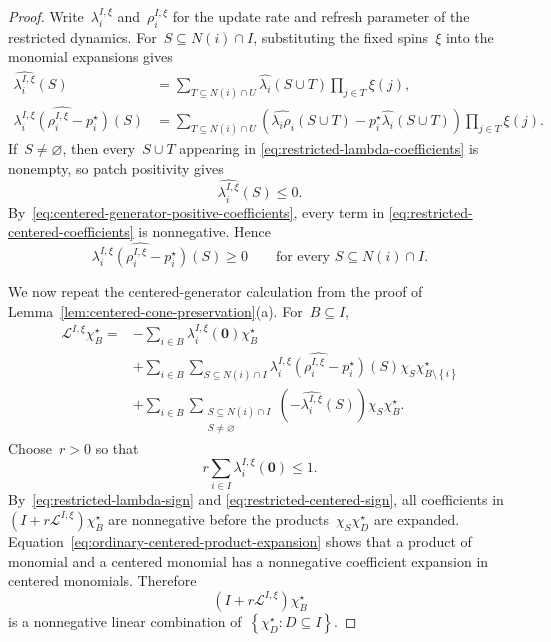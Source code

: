 \documentclass[EJP,preprint,NODS,nobera]{ejpecp}
\newcommand{\bb}[1]{\left(#1\right)}
\newcommand{\cb}[1]{\left\{#1\right\}}
\newcommand{\mb}[1]{\mathbf{#1}}
\newcommand{\Lcal}{\mathcal{L}}
\begin{document}
\begin{proof}
Write~$\lambda_i^{I,\xi}$ and~$\rho_i^{I,\xi}$ for the update rate and
refresh parameter of the restricted dynamics. For~$S\subseteq N(i)\cap I$,
substituting the fixed spins~$\xi$ into the monomial expansions gives
\begin{align}
\widehat{\lambda_i^{I,\xi}}(S)
&=
\sum_{T\subseteq N(i)\cap U}
\widehat{\lambda_i}(S\cup T)
\prod_{j\in T}\xi(j),
\label{eq:restricted-lambda-coefficients}
\\
\widehat{
\lambda_i^{I,\xi}
\bb{\rho_i^{I,\xi}-p_i^\star}
}(S)
&=
\sum_{T\subseteq N(i)\cap U}
\bb{
\widehat{\lambda_i\rho_i}(S\cup T)
-
p_i^\star\widehat{\lambda_i}(S\cup T)
}
\prod_{j\in T}\xi(j).
\label{eq:restricted-centered-coefficients}
\end{align}
If~$S\neq\varnothing$, then every~$S\cup T$ appearing in
\eqref{eq:restricted-lambda-coefficients} is nonempty, so patch positivity
gives
\begin{equation}
\label{eq:restricted-lambda-sign}
\widehat{\lambda_i^{I,\xi}}(S)\leq0.
\end{equation}
By~\eqref{eq:centered-generator-positive-coefficients}, every term in
\eqref{eq:restricted-centered-coefficients} is nonnegative. Hence
\begin{equation}
\label{eq:restricted-centered-sign}
\widehat{
\lambda_i^{I,\xi}
\bb{\rho_i^{I,\xi}-p_i^\star}
}(S)
\geq0
\qquad
\text{for every }S\subseteq N(i)\cap I.
\end{equation}

We now repeat the centered-generator calculation from the proof of Lemma~\ref{lem:centered-cone-preservation}(a). For~$B\subseteq I$,
\begin{align*}
\Lcal^{I,\xi}\chi_B^\star
={}&
-\sum_{i\in B}
\lambda_i^{I,\xi}(\mb 0)\chi_B^\star
\\
&+
\sum_{i\in B}
\sum_{S\subseteq N(i)\cap I}
\widehat{
\lambda_i^{I,\xi}
\bb{\rho_i^{I,\xi}-p_i^\star}
}(S)
\chi_S\chi_{B\setminus\cb{i}}^\star
\\
&+
\sum_{i\in B}
\sum_{\substack{S\subseteq N(i)\cap I\\S\neq\varnothing}}
\bb{-\widehat{\lambda_i^{I,\xi}}(S)}
\chi_S\chi_B^\star.
\end{align*}
Choose~$r>0$ so that
\begin{equation*}
r\sum_{i\in I}\lambda_i^{I,\xi}(\mb 0)\leq1.
\end{equation*}
By~\eqref{eq:restricted-lambda-sign} and
\eqref{eq:restricted-centered-sign}, all coefficients in~$(I+r\Lcal^{I,\xi})\chi_B^\star$ are nonnegative before the products~$\chi_S\chi_D^\star$ are expanded. Equation~\eqref{eq:ordinary-centered-product-expansion} shows that a product of monomial and a centered monomial has a nonnegative coefficient expansion in centered monomials. Therefore
\begin{equation*}
\bb{I+r\Lcal^{I,\xi}}\chi_B^\star
\end{equation*}
is a nonnegative linear combination of~$\cb{\chi_D^\star:D\subseteq I}$.


\end{proof}
\end{document}
